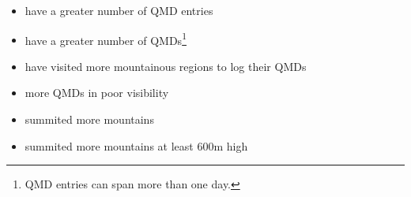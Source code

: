 \documentclass[
  12pt,
  a4paper,
]{book}
\providecommand{\tightlist}{%
  \setlength{\itemsep}{0pt}\setlength{\parskip}{0pt}}
\begin{document}
\begin{itemize}
  \begin{itemize}
  \tightlist
  \item
    have a greater number of QMD entries
  \item
    have a greater number of QMDs\footnote{QMD entries can span more than one day.}
  \item
    have visited more mountainous regions to log their QMDs
  \item
    more QMDs in poor visibility
  \item
    summited more mountains
  \item
    summited more mountains at least 600m high
  \end{itemize}
\end{itemize}

\begin{landscape}\begin{table}


\end{table}
\end{landscape}
\end{document}
